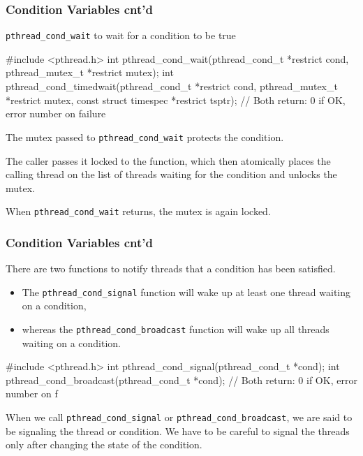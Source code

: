 \documentclass[newPxFont,sthlmFooter,nooffset]{beamer}
\begin{document}
\begin{frame}[t, fragile]
  \frametitle{Condition Variables cnt'd}
\texttt{pthread\_cond\_wait} to wait for a condition to be true

\begin{codedef}
#include <pthread.h>
int pthread_cond_wait(pthread_cond_t *restrict cond,
                      pthread_mutex_t *restrict mutex);
int pthread_cond_timedwait(pthread_cond_t *restrict cond,
                      pthread_mutex_t *restrict mutex,
                      const struct timespec *restrict tsptr);
// Both return: 0 if OK, error number on failure
\end{codedef}

The mutex passed to \texttt{pthread\_cond\_wait} protects the condition.

The caller passes it locked to the function, which then atomically places the calling thread on the list of threads waiting for the condition and unlocks the mutex.

 When \texttt{pthread\_cond\_wait} returns, the mutex is again locked.
\end{frame}

\begin{frame}[t, fragile]
  \frametitle{Condition Variables cnt'd}
There are two functions to notify threads that a condition has been satisfied.
\begin{itemize}
\item The \texttt{pthread\_cond\_signal} function will wake up at least one
  thread waiting on a condition,
\item whereas the \texttt{pthread\_cond\_broadcast} function will wake
  up all threads waiting on a condition.
\end{itemize}

\begin{codedef}
#include <pthread.h>
int pthread_cond_signal(pthread_cond_t *cond);
int pthread_cond_broadcast(pthread_cond_t *cond);
// Both return: 0 if OK, error number on f
\end{codedef}
When we call \texttt{pthread\_cond\_signal} or \texttt{pthread\_cond\_broadcast}, we are said to be signaling the thread or condition. We have to be careful to signal the threads only after changing the state of the condition.
\end{frame}
\end{document}
